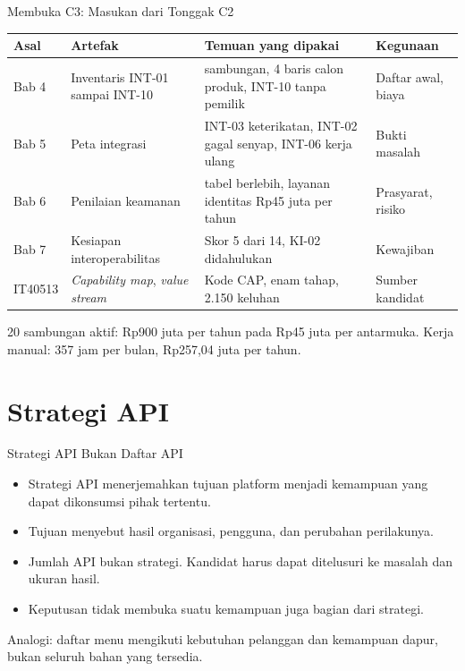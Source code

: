 \documentclass[aspectratio=169, table, 12pt]{beamer}
\begin{document}
\begin{frame}{{\Large Membuka C3: Masukan dari Tonggak C2}}
  \footnotesize
  \begin{tabularx}{\textwidth}{>{\raggedright\arraybackslash}p{1.5cm}
      >{\raggedright\arraybackslash}p{3.3cm} >{\raggedright\arraybackslash}X >{\raggedright\arraybackslash}p{2.7cm}}
    \hline
    \textbf{Asal} & \textbf{Artefak} & \textbf{Temuan yang dipakai} & \textbf{Kegunaan} \\ \hline
    Bab 4 & Inventaris INT-01 sampai INT-10 & 100 sambungan, 4 baris calon produk, INT-10 tanpa pemilik & Daftar awal, biaya \\ \hline
    Bab 5 & Peta integrasi & INT-03 keterikatan, INT-02 gagal senyap, INT-06 kerja ulang & Bukti masalah \\ \hline
    Bab 6 & Penilaian keamanan & 138 tabel berlebih, layanan identitas Rp45 juta per tahun & Prasyarat, risiko \\ \hline
    Bab 7 & Kesiapan interoperabilitas & Skor 5 dari 14, KI-02 didahulukan & Kewajiban \\ \hline
    IT40513 & \textit{Capability map}, \textit{value stream} & Kode CAP, enam tahap, 2.150 keluhan & Sumber kandidat \\ \hline
  \end{tabularx}

  \vspace{8pt}
  \small 20 sambungan aktif: Rp900 juta per tahun pada Rp45 juta per antarmuka. Kerja manual: 357 jam per bulan, Rp257,04 juta per tahun.
\end{frame}

\section{Strategi API}

\begin{frame}{{\Large Strategi API Bukan Daftar API}}
  \vspace{8pt}
  \begin{itemize}
    \item Strategi API menerjemahkan tujuan platform menjadi kemampuan yang dapat dikonsumsi pihak tertentu.
    \item Tujuan menyebut hasil organisasi, pengguna, dan perubahan perilakunya.
    \item Jumlah API bukan strategi. Kandidat harus dapat ditelusuri ke masalah dan ukuran hasil.
    \item Keputusan tidak membuka suatu kemampuan juga bagian dari strategi.
  \end{itemize}
  \vspace{6pt}
  {\small Analogi: daftar menu mengikuti kebutuhan pelanggan dan kemampuan dapur, bukan seluruh bahan yang tersedia.}
\end{frame}
\end{document}
